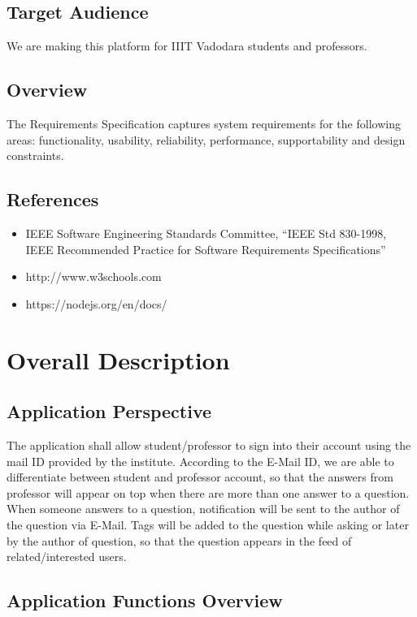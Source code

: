 \documentclass[journal,12pt,onecolumn,draftclsnofoot,]{IEEEtran}
\begin{document}
\subsection{Target Audience}
We are making this platform for IIIT Vadodara students and professors. 

\subsection{Overview}

The Requirements Specification captures system requirements for the following areas: functionality,
usability, reliability, performance, supportability and design constraints.

\subsection{References}
\begin{itemize}
\item IEEE Software Engineering Standards Committee, “IEEE Std 830-1998, IEEE Recommended Practice for Software Requirements Specifications”
\item http://www.w3schools.com
\item https://nodejs.org/en/docs/
\end{itemize}

\section{Overall Description}

\subsection{Application Perspective}
The application shall allow student/professor to sign into their account using the mail ID provided by the institute. According to the E-Mail ID, we are able to differentiate between student and professor account, so that the answers from professor will appear on top when there are more than one answer to a question. When someone answers to a question, notification will be sent to the author of the question via E-Mail. Tags will be added to the question while asking or later by the author of question, so that the question appears in the feed of related/interested users. 

\subsection{Application Functions Overview}
\end{document}
